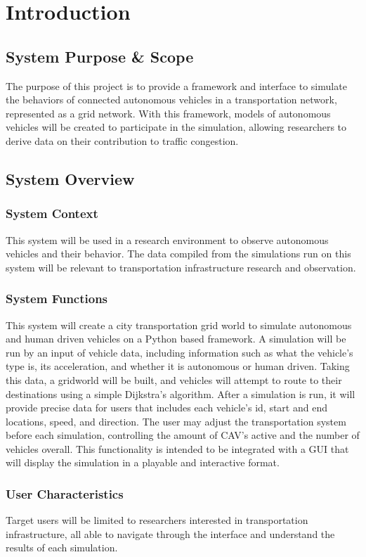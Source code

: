 \documentclass[onecolumn, draftclsnofoot,10pt, compsoc]{IEEEtran}
\begin{document}
\newpage

\section{Introduction}
\subsection{System Purpose \& Scope}
The purpose of this project is to provide a framework and interface to simulate the behaviors of connected autonomous vehicles in a transportation network, represented as a grid network.
With this framework, models of autonomous vehicles will be created to participate in the simulation, allowing researchers to derive data on their contribution to traffic congestion.
\subsection{System Overview}
\subsubsection{System Context}
This system will be used in a research environment to observe autonomous vehicles and their behavior.
The data compiled from the simulations run on this system will be relevant to transportation infrastructure research and observation.
\subsubsection{System Functions}
This system will create a city transportation grid world to simulate autonomous and human driven vehicles on a Python based framework.
A simulation will be run by an input of vehicle data, including information such as what the vehicle’s type is, its acceleration, and whether it is autonomous or human driven.
Taking this data, a gridworld will be built, and vehicles will attempt to route to their destinations using a simple Dijkstra’s algorithm.
After a simulation is run, it will provide precise data for users that includes each vehicle's id, start and end locations, speed, and direction.
The user may adjust the transportation system before each simulation, controlling the amount of CAV’s active and the number of vehicles overall.
This functionality is intended to be integrated with a GUI that will display the simulation in a playable and interactive format.
\subsubsection{User Characteristics}
Target users will be limited to researchers interested in transportation infrastructure, all able to navigate through the interface and understand the results of each simulation.
\end{document}
